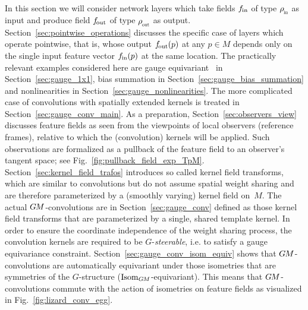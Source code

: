 In this section we will consider network layers which take fields $f_\textup{\;\!\!in}$ of type $\rhoin$ as input and produce field $f_\textup{\:\!\!out}$ of type $\rhoout$ as output.
Section~\ref{sec:pointwise_operations} discusses the specific case of layers which operate pointwise, that is, whose output $f_\textup{\:\!\!out}(p)$ at any $p\in M$ depends only on the single input feature vector $f_\textup{\;\!\!in}(p)$ at the same location.
The practically relevant examples considered here are gauge equivariant \onexones\ in Section~\ref{sec:gauge_1x1}, bias summation in Section~\ref{sec:gauge_bias_summation} and nonlinearities in Section~\ref{sec:gauge_nonlinearities}.
The more complicated case of convolutions with spatially extended kernels is treated in Section~\ref{sec:gauge_conv_main}.
As a preparation, Section~\ref{sec:observers_view} discusses feature fields as seen from the viewpoints of local observers (reference frames), relative to which the (convolution) kernels will be applied.
Such observations are formalized as a pullback of the feature field to an observer's tangent space; see Fig.~\ref{fig:pullback_field_exp_TpM}.
Section~\ref{sec:kernel_field_trafos} introduces so called kernel field transforms, which are similar to convolutions but do not assume spatial weight sharing and are therefore parameterized by a (smoothly varying) kernel field on~$M$.
The actual $G\mkern-1.4muM$-convolutions are in Section~\ref{sec:gauge_conv} defined as those kernel field transforms that are parameterized by a single, shared template kernel.
In order to ensure the coordinate independence of the weight sharing process, the convolution kernels are required to be $G$-\emph{steerable}, i.e. to satisfy a gauge equivariance constraint.
Section~\ref{sec:gauge_conv_isom_equiv} shows that $G\mkern-1.4muM$-convolutions are automatically equivariant under those isometries that are symmetries of the $G$-structure ($\operatorname{Isom}_{G\mkern-1.4muM}$-equivariant).
This means that $G\mkern-1.4muM$-convolutions commute with the action of isometries on feature fields as visualized in Fig.~\ref{fig:lizard_conv_egg}.




